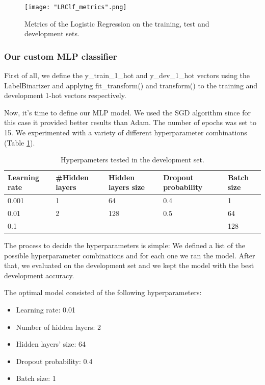 \documentclass[10pt, a4paper]{article}
\begin{document}
    \begin{figure}
	    \centering
            \texttt{[image: "LRClf\_metrics".png]}
	    \caption{Metrics of the Logistic Regression on the training, test and development sets.}
	    \label{fig::LR_metrics}
     \end{figure}


    \subsubsection{Our custom MLP classifier}

    First of all, we define the y\_train\_1\_hot and y\_dev\_1\_hot vectors using the LabelBinarizer and applying fit\_transform() and transform() to the training and development 1-hot vectors respectively.
    
    Now, it’s time to define our MLP model. We used the SGD algorithm since for this case it provided better results than Adam. The number of epochs was set to 15. We experimented with a variety of different hyperparameter combinations (Table \ref{tab::ex-9-hyper}).

  


\begin{table}
    \centering
    \begin{tabular}{|l|l|l|l|l|}
    \hline
    \rowcolor{blue!25}\textbf{Learning rate} & \cellcolor{blue!25}\textbf{\#Hidden layers} & \cellcolor{blue!25}\textbf{Hidden layers size} & \cellcolor{blue!25}\textbf{Dropout probability} & \cellcolor{blue!25}\textbf{Batch size}\\
    \hline
    0.001 & 1 & 64 & 0.4 & 1\\
    \hline
    0.01 & 2 & 128 & 0.5 & 64\\
    \hline
    0.1 &  &  & & 128 \\
   
    

    \hline
    \end{tabular}
    \caption{Hyperpameters tested in the development set.}
    \label{tab::ex-9-hyper}
\end{table}

The process to decide the hyperparameters is simple: We defined a list of the possible hyperparameter combinations and for each one we ran the model. After that, we evaluated on the development set and we kept the model with the best development accuracy.


    The optimal model consisted of the following hyperparameters:
    \begin{itemize}
        \item Learning rate: 0.01
        \item Number of hidden layers: 2
        \item Hidden layers' size: 64
        \item Dropout probability: 0.4
        \item Batch size: 1
    \end{itemize}
    
\end{document}
